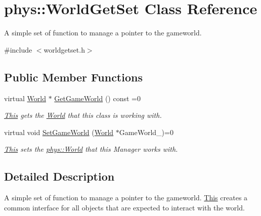 \hypertarget{classphys_1_1WorldGetSet}{
\section{phys::WorldGetSet Class Reference}
\label{dc/d4f/classphys_1_1WorldGetSet}
}


A simple set of function to manage a pointer to the gameworld.  




{\ttfamily \#include $<$worldgetset.h$>$}

\subsection*{Public Member Functions}
\begin{DoxyCompactItemize}
\item 
virtual \hyperlink{classphys_1_1World}{World} $\ast$ \hyperlink{classphys_1_1WorldGetSet_ae11f48a9152834423647ea44e7fd7ee5}{GetGameWorld} () const =0
\begin{DoxyCompactList}\small\item\em \hyperlink{structThis}{This} gets the \hyperlink{classphys_1_1World}{World} that this class is working with. \item\end{DoxyCompactList}\item 
\hypertarget{classphys_1_1WorldGetSet_a03f596502ff3436f249169833ae7f9c6}{
virtual void \hyperlink{classphys_1_1WorldGetSet_a03f596502ff3436f249169833ae7f9c6}{SetGameWorld} (\hyperlink{classphys_1_1World}{World} $\ast$GameWorld\_\-)=0}
\label{dc/d4f/classphys_1_1WorldGetSet_a03f596502ff3436f249169833ae7f9c6}

\begin{DoxyCompactList}\small\item\em \hyperlink{structThis}{This} sets the \hyperlink{classphys_1_1World}{phys::World} that this Manager works with. \item\end{DoxyCompactList}\end{DoxyCompactItemize}


\subsection{Detailed Description}
A simple set of function to manage a pointer to the gameworld. \hyperlink{structThis}{This} creates a common interface for all objects that are expected to interact with the world. 

